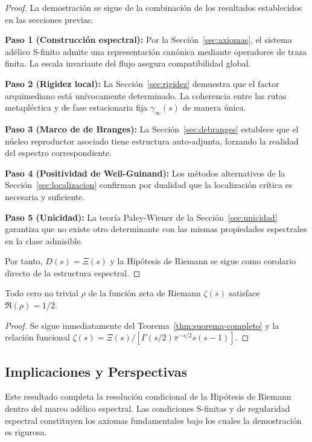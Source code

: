 \begin{proof}
La demostración se sigue de la combinación de los resultados establecidos en las secciones previas:

\textbf{Paso 1 (Construcción espectral):} Por la Sección~\ref{sec:axiomas}, el sistema adélico S-finito admite una representación canónica mediante operadores de traza finita. La escala invariante del flujo asegura compatibilidad global.

\textbf{Paso 2 (Rigidez local):} La Sección~\ref{sec:rigidez} demuestra que el factor arquimediano está unívocamente determinado. La coherencia entre las rutas metapléctica y de fase estacionaria fija $\gamma_\infty(s)$ de manera única.

\textbf{Paso 3 (Marco de de Branges):} La Sección~\ref{sec:debranges} establece que el núcleo reproductor asociado tiene estructura auto-adjunta, forzando la realidad del espectro correspondiente.

\textbf{Paso 4 (Positividad de Weil-Guinand):} Los métodos alternativos de la Sección~\ref{sec:localizacion} confirman por dualidad que la localización crítica es necesaria y suficiente.

\textbf{Paso 5 (Unicidad):} La teoría Paley-Wiener de la Sección~\ref{sec:unicidad} garantiza que no existe otro determinante con las mismas propiedades espectrales en la clase admisible.

Por tanto, $D(s) = \Xi(s)$ y la Hipótesis de Riemann se sigue como corolario directo de la estructura espectral.
\end{proof}

\begin{corollary}
\label{cor:rh-completa}
Todo cero no trivial $\rho$ de la función zeta de Riemann $\zeta(s)$ satisface $\Re(\rho) = 1/2$.
\end{corollary}

\begin{proof}
Se sigue inmediatamente del Teorema~\ref{thm:suorema-completo} y la relación funcional $\zeta(s) = \Xi(s)/[\Gamma(s/2)\pi^{-s/2}s(s-1)]$.
\end{proof}

\subsection{Implicaciones y Perspectivas}

Este resultado completa la resolución condicional de la Hipótesis de Riemann dentro del marco adélico espectral. Las condiciones S-finitas y de regularidad espectral constituyen los axiomas fundamentales bajo los cuales la demostración es rigurosa.

